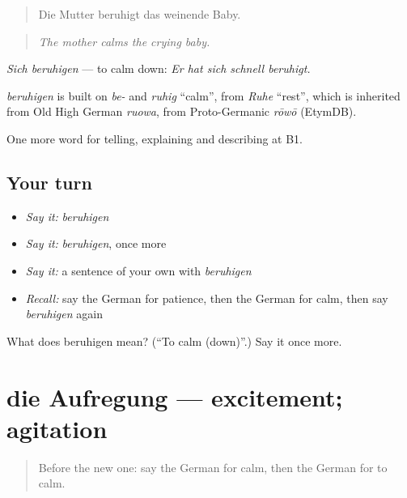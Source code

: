 \begin{quote}
Die Mutter beruhigt das weinende Baby.
\end{quote}

\begin{quote}
\emph{The mother calms the crying baby.}
\end{quote}

\emph{Sich beruhigen} — to calm down: \emph{Er hat sich schnell beruhigt.}

\begin{cousinweb}
\emph{beruhigen} is built on \emph{be-} and \emph{ruhig} \textquotedblleft{}calm\textquotedblright{}, from \emph{Ruhe} \textquotedblleft{}rest\textquotedblright{}, which is inherited from Old High German \emph{ruowa}, from Proto-Germanic \emph{rōwō} (EtymDB).
\end{cousinweb}

\begin{grammarlens}[title={What you've built}]
One more word for telling, explaining and describing at B1.
\end{grammarlens}

\subsection*{Your turn}
\begin{itemize}
\raggedright
  \item \emph{Say it:} \emph{beruhigen}
  \item \emph{Say it:} \emph{beruhigen}, once more
  \item \emph{Say it:} a sentence of your own with \emph{beruhigen}
  \item \emph{Recall:} say the German for patience, then the German for calm, then say \emph{beruhigen} again
\end{itemize}

\begin{tcolorbox}[breakable,colback=teal!4,colframe=teal!35!black,title={Before you move on}]
What does beruhigen mean? (\textquotedblleft{}To calm (down)\textquotedblright{}.) Say it once more.
\end{tcolorbox}
\section[die Aufregung]{die Aufregung — excitement; agitation}

\label{lesson:GE-C470-aufregung}



\begin{quote}
Before the new one: say the German for calm, then the German for to calm.
\end{quote}

